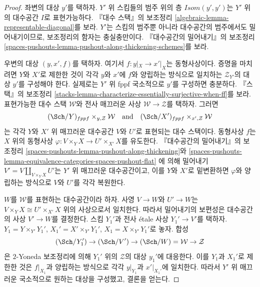 \begin{proof}
좌변의 대상 $y'$를 택하자. $Y'$ 위 스킴들의 범주 위의 층
$\mathit{Isom}(y', y')$는 $Y'$ 위의 대수공간 $I$로 표현가능하다.
『대수 스택』의 보조정리
\ref{algebraic-lemma-representable-diagonal}를 보라. $Y'$는 스킴의
범주뿐 아니라 대수공간의 범주에서도 밀어내기이므로, 보조정리의 함자는
충실충만이다. 『대수공간의 밀어내기』의 보조정리
\ref{spaces-pushouts-lemma-pushout-along-thickening-schemes}를 보라.

\medskip\noindent
우변의 대상 $(y, x', f)$를 택하자. 여기서 $f : y|_X \to x'|_X$는
동형사상이다. 증명을 마치려면 $Y$와 $X'$로 제한한 것이 각각 $y$와
$x'$에 $f$와 양립하는 방식으로 일치하는 $\mathcal{Z}_{Y'}$의 대상
$y'$를 구성해야 한다. 실제로는 $Y'$ 위 fppf 국소적으로 $y'$를
구성하면 충분하다. 『스택』의 보조정리
\ref{stacks-lemma-characterize-essentially-surjective-when-ff}를 보라.
표현가능한 대수 스택 $\mathcal{W}$와 전사 매끄러운 사상
$\mathcal{W} \to \mathcal{Z}$를 택하자. 그러면
$$
(\Sch/Y)_{fppf} \times_{y, \mathcal{Z}} \mathcal{W}
\quad\text{and}\quad
(\Sch/X')_{fppf} \times_{x', \mathcal{Z}} \mathcal{W}
$$
는 각각 $Y$와 $X'$ 위 매끄러운 대수공간 $V$와 $U'$로 표현되는
대수 스택이다. 동형사상 $f$는 $X$ 위의 동형사상
$\varphi : V \times_Y X \to U' \times_{X'} X$를 유도한다.
『대수공간의 밀어내기』의 보조정리
\ref{spaces-pushouts-lemma-pushout-along-thickening}와
\ref{spaces-pushouts-lemma-equivalence-categories-spaces-pushout-flat}
에 의해 밀어내기 $V' = V \amalg_{V \times_Y X} U'$는 $Y'$ 위 매끄러운
대수공간이고, 이를 $Y$와 $X'$로 밑변환하면 $\varphi$와 양립하는 방식으로
$V$와 $U'$를 각각 복원한다.

\medskip\noindent
$W$를 $\mathcal{W}$를 표현하는 대수공간이라 하자. 사영
$V \to W$와 $U' \to W$는
$V \times_Y X \cong U' \times_{X'} X$ 위의 사상으로서 일치한다.
따라서 밀어내기의 보편성은 대수공간의 사상 $V' \to W$를 결정한다.
스킴 $Y_1'$과 전사 \'etale 사상 $Y_1' \to V'$를 택하자.
$Y_1 = Y \times_{Y'} Y_1'$,
$X_1' = X' \times_{Y'} Y_1'$, $X_1 = X \times_{Y'} Y_1'$로 놓자.
합성
$$
(\Sch/Y_1') \to (\Sch/V') \to (\Sch/W) = \mathcal{W} \to \mathcal{Z}
$$
은 $2$-Yoneda 보조정리에 의해 $Y_1'$ 위의 $\mathcal{Z}$의 대상
$y_1'$에 대응한다. 이를 $Y_1$과 $X_1'$로 제한한 것은
$f|_{X_1}$과 양립하는 방식으로 각각 $y|_{Y_1}$과 $x'|_{X_1'}$에
일치한다. 따라서 $Y'$ 위 매끄러운 국소적으로 원하는 대상을 구성했고,
결론을 얻는다.
\end{proof}









